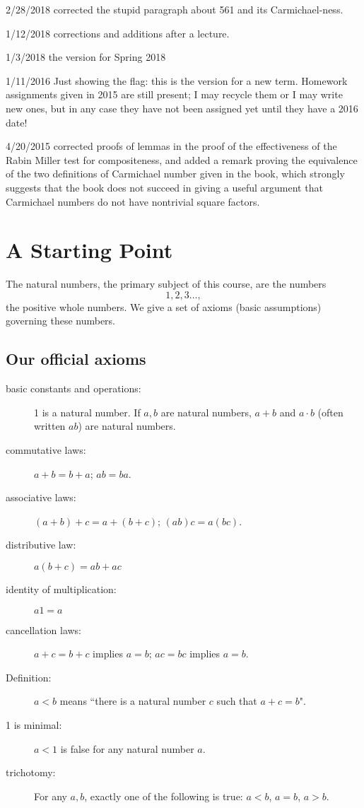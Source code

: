 \documentclass[12pt]{article}
\begin{document}
2/28/2018 corrected the stupid paragraph about 561 and its Carmichael-ness.

1/12/2018 corrections and additions after a lecture.

1/3/2018 the version for Spring 2018

1/11/2016  Just showing the flag:  this is the version for a new term.  Homework assignments given in 2015 are still present; I may recycle them or I may write new ones, but in any case they have not been assigned yet until they have a 2016 date!

4/20/2015 corrected proofs of lemmas in the proof of the effectiveness of the Rabin Miller test for compositeness, and added a remark proving the equivalence of the two definitions of Carmichael number given in the book, which strongly suggests that the book does not succeed in giving a useful argument that Carmichael numbers do not have nontrivial square factors.

\tableofcontents

\newpage

\section{A Starting Point}

The natural numbers, the primary subject of this course, are the numbers $$1,2,3\ldots, $$  the positive whole numbers.
We give a set of axioms (basic assumptions) governing these numbers.

\subsection{Our official axioms}

\begin{description}

\item[basic constants and operations:]  1 is a natural number.  If $a,b$ are natural numbers, $a+b$ and $a\cdot b$ (often written $ab$) are natural numbers.

\item[commutative laws:]  $a+b=b+a$; $ab=ba$. 

\item[associative laws:]  $(a+b)+c=a+(b+c)$;  $(ab)c=a(bc)$.

\item[distributive law:]  $a(b+c)=ab+ac$

\item[identity of multiplication:]  $a1=a$

\item[cancellation laws:]  $a+c=b+c$ implies $a=b$;  $ac=bc$ implies $a=b$.

\item[Definition:]  $a<b$ means ``there is a natural number $c$ such that $a+c=b$".

\item[1 is minimal:]  $a<1$ is false for any natural number $a$.

\item[trichotomy:]  For any $a,b$, exactly one of the following is true:  $a<b$, $a=b$, $a>b$.

\end{description}
\end{document}
